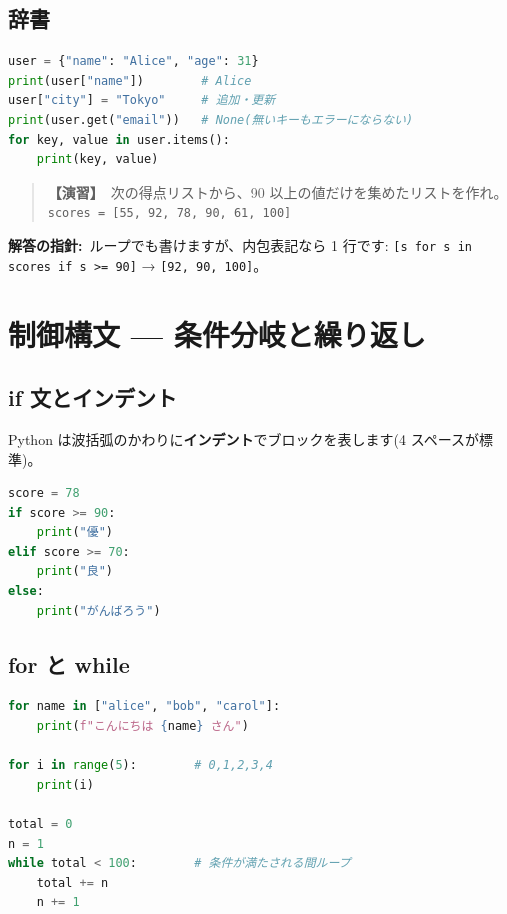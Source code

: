 \documentclass{article}
\begin{document}
\subsection{辞書}

\begin{lstlisting}[language=Python]
user = {"name": "Alice", "age": 31}
print(user["name"])        # Alice
user["city"] = "Tokyo"     # 追加・更新
print(user.get("email"))   # None(無いキーもエラーにならない)
for key, value in user.items():
    print(key, value)
\end{lstlisting}

\begin{quote}
\textbf{【演習】}\ 次の得点リストから、90 以上の値だけを集めたリストを作れ。
\texttt{scores = [55, 92, 78, 90, 61, 100]}
\end{quote}

\textbf{解答の指針:}\ ループでも書けますが、内包表記なら 1 行です:
\texttt{[s for s in scores if s >= 90]} → \texttt{[92, 90, 100]}。

\section{制御構文 — 条件分岐と繰り返し}

\subsection{if 文とインデント}

Python は波括弧のかわりに\textbf{インデント}でブロックを表します(4 スペースが標準)。

\begin{lstlisting}[language=Python]
score = 78
if score >= 90:
    print("優")
elif score >= 70:
    print("良")
else:
    print("がんばろう")
\end{lstlisting}

\subsection{for と while}

\begin{lstlisting}[language=Python]
for name in ["alice", "bob", "carol"]:
    print(f"こんにちは {name} さん")

for i in range(5):        # 0,1,2,3,4
    print(i)

total = 0
n = 1
while total < 100:        # 条件が満たされる間ループ
    total += n
    n += 1
\end{lstlisting}
\end{document}
